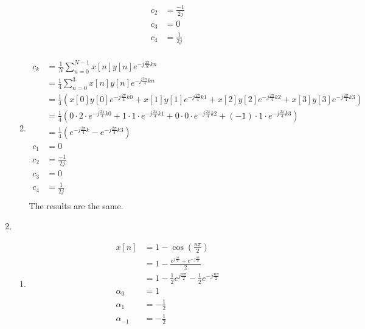 \documentclass[10pt,a4paper, margin=1in]{article}
\begin{document}
\begin{enumerate}
\begin{enumerate}
\begin{align*}
        c_2 & = \frac{-1}{2j}\\
        c_3 & = 0 \\
        c_4 & = \frac{1}{2j}\\
    \end{align*}
	\item %
    \begin{align*}
        c_k & = \frac{1}{N} \sum_{n=0}^{N - 1} x[n]y[n]e^{-j\frac{2\pi}{N}kn} \\
        & = \frac{1}{4} \sum_{n=0}^{3} x[n]y[n]e^{-j\frac{2\pi}{4}kn} \\
        & = \frac{1}{4} (x[0]y[0]e^{-j\frac{2\pi}{4}k0} + x[1]y[1]e^{-j\frac{2\pi}{4}k1} + x[2]y[2]e^{-j\frac{2\pi}{4}k2} + x[3]y[3]e^{-j\frac{2\pi}{4}k3}) \\
        & = \frac{1}{4} (0 \cdot 2 \cdot e^{-j\frac{2\pi}{4}k0} + 1 \cdot 1 \cdot e^{-j\frac{2\pi}{4}k1} + 0 \cdot 0 \cdot e^{-j\frac{2\pi}{4}k2} + (-1) \cdot 1 \cdot e^{-j\frac{2\pi}{4}k3}) \\
        & = \frac{1}{4} (e^{-j\frac{2\pi}{4}k} - e^{-j\frac{2\pi}{4}k3}) \\
        c_1 & = 0 \\
        c_2 & = \frac{-1}{2j}\\
        c_3 & = 0 \\
        c_4 & = \frac{1}{2j}\\
    \end{align*}
    The results are the same.
    \end{enumerate}    
    
\item %
    \begin{enumerate}
    \item %
    \begin{align*}
        x[n] & = 1 - \cos(\frac{n\pi}{2}) \\
        & = 1 - \frac{e^{j\frac{n\pi}{2}} + e^{-j\frac{n\pi}{2}}}{2} \\
        & = 1 - \frac{1}{2}e^{j\frac{n\pi}{2}} - \frac{1}{2}e^{-j\frac{n\pi}{2}} \\
        \alpha_0 & = 1 \\
        \alpha_1 & = -\frac{1}{2} \\
        \alpha_{-1} & = -\frac{1}{2} \\
    \end{align*}


\end{enumerate}
\end{enumerate}
\end{document}
